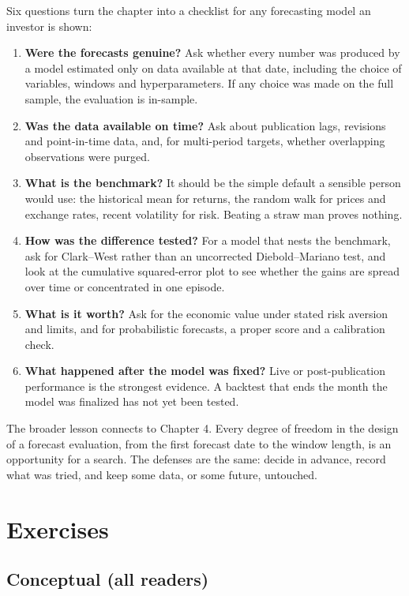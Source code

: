 Six questions turn the chapter into a checklist for any forecasting model an investor is shown:

\begin{enumerate}
  \item \textbf{Were the forecasts genuine?} Ask whether every number was produced by a model estimated only on data available at that date, including the choice of variables, windows and hyperparameters. If any choice was made on the full sample, the evaluation is in-sample.
  \item \textbf{Was the data available on time?} Ask about publication lags, revisions and point-in-time data, and, for multi-period targets, whether overlapping observations were purged.
  \item \textbf{What is the benchmark?} It should be the simple default a sensible person would use: the historical mean for returns, the random walk for prices and exchange rates, recent volatility for risk. Beating a straw man proves nothing.
  \item \textbf{How was the difference tested?} For a model that nests the benchmark, ask for Clark--West rather than an uncorrected Diebold--Mariano test, and look at the cumulative squared-error plot to see whether the gains are spread over time or concentrated in one episode.
  \item \textbf{What is it worth?} Ask for the economic value under stated risk aversion and limits, and for probabilistic forecasts, a proper score and a calibration check.
  \item \textbf{What happened after the model was fixed?} Live or post-publication performance is the strongest evidence. A backtest that ends the month the model was finalized has not yet been tested.
\end{enumerate}

The broader lesson connects to Chapter 4. Every degree of freedom in the design of a forecast evaluation, from the first forecast date to the window length, is an opportunity for a search. The defenses are the same: decide in advance, record what was tried, and keep some data, or some future, untouched.

\section*{Exercises}

\subsection*{Conceptual (all readers)}

